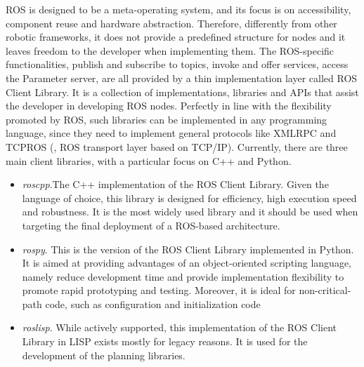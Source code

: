ROS is designed to be a meta-operating system, and its focus is on accessibility, component reuse and hardware abstraction. Therefore, differently from other robotic frameworks, it does not provide a predefined structure for nodes and it leaves freedom to the developer when implementing them. The ROS-specific functionalities, publish and subscribe to topics, invoke and offer services, access the Parameter server, are all provided by a thin implementation layer called ROS Client Library. It is a collection of implementations, libraries and APIs that assist the developer in developing ROS nodes. Perfectly in line with the flexibility promoted by ROS, such libraries can be implemented in any programming language, since they need to implement general protocols like XMLRPC and TCPROS (\ie, ROS transport layer based on TCP/IP). Currently, there are three main client libraries, with a particular focus on C++ and Python.
\begin{itemize}
\item \textit{roscpp}.The C++ implementation of the ROS Client Library. Given the language of choice, this library is designed for efficiency, high execution speed and robustness. It is the most widely used library and it should be used when targeting the final deployment of a ROS-based architecture. 
\item \textit{rospy}. This is the version of the ROS Client Library implemented in Python. It is aimed at providing advantages of an object-oriented scripting language, namely reduce development time and provide implementation flexibility to promote rapid prototyping and testing. Moreover, it is  ideal for non-critical-path code, such as configuration and initialization code
\item \textit{roslisp}. While actively supported, this implementation of the ROS Client Library in LISP exists mostly for legacy reasons. It is used for the development of the planning libraries. 
\end{itemize}

